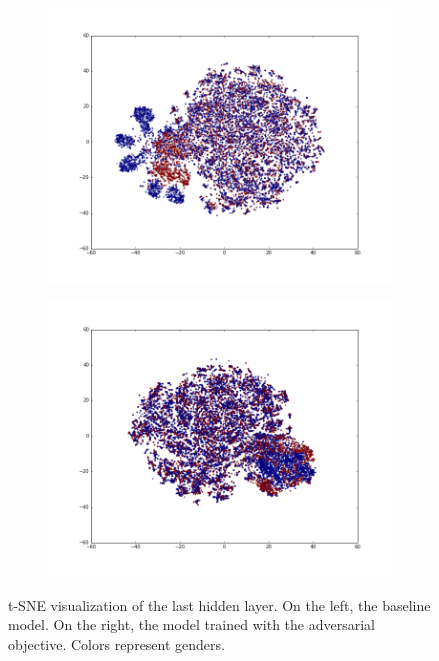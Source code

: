 \documentclass{article}
\begin{document}
\begin{figure}
    \centering
    \begin{subfigure}[b]{0.5\linewidth}
        \centering
        \includegraphics[width=\linewidth]{tsne-original.png}
    \end{subfigure}%
    \begin{subfigure}[b]{0.5\linewidth}
        \centering
        \includegraphics[width=\linewidth]{tsne-invariant.png}
    \end{subfigure}%
    \caption{t-SNE visualization of the last hidden layer. On the left, the baseline
    model. On the right, the model trained with the adversarial objective. Colors 
    represent genders.}
    \label{fig:tsne}
\end{figure}
\end{document}
